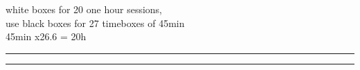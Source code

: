 {\footnotesize 
white boxes for 20 one hour sessions, \\
use black boxes for 27 timeboxes of 45min \\
45min x26.6 = 20h
}
\vspace{1em}

\twentyhourprojectreview 
\hrule 

\vspace{1em}

\twentyhourprojectreview 
\hrule 

\vspace{1em}

\twentyhourprojectreview 



\newpage





